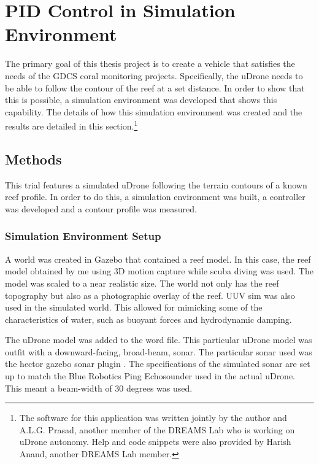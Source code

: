 
\chapter{PID Control in Simulation Environment}

The primary goal of this thesis project is to create a vehicle that satisfies the needs of the GDCS coral monitoring projects. Specifically, the uDrone needs to be able to follow the contour of the reef at a set distance. In order to show that this is possible, a simulation environment was developed that shows this capability. The details of how this simulation environment was created and the results are detailed in this section.\footnote{The software for this application was written jointly by the author and A.L.G. Prasad, another member of the DREAMS Lab who is working on uDrone autonomy. Help and code snippets were also provided by Harish Anand, another DREAMS Lab member.} 

\section{Methods}

This trial features a simulated uDrone following the terrain contours of a known reef profile. In order to do this, a simulation environment was built, a controller was developed and a contour profile was measured.  

\subsection{Simulation Environment Setup}

A world was created in Gazebo that contained a reef model. In this case, the reef model obtained by me using 3D motion capture while scuba diving was used. The model was scaled to a near realistic size. The world not only has the reef topography but also as a photographic overlay of the reef. UUV sim was also used in the simulated world. This allowed for mimicking some of the characteristics of water, such as buoyant forces and hydrodynamic damping. 

The uDrone model was added to the word file. This particular uDrone model was outfit with a downward-facing, broad-beam, sonar. The particular sonar used was the hector gazebo sonar plugin \parencite{sonar}. The specifications of the simulated sonar are set up to match the Blue Robotics Ping Echosounder used in the actual uDrone. This meant a beam-width of 30 degrees was used.

